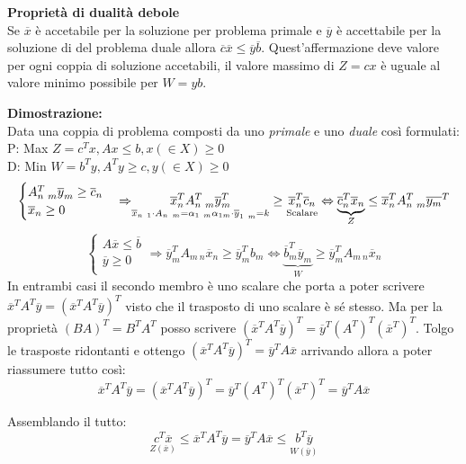 \documentclass{article}
\begin{document}
\textbf{Proprietà di dualità debole}\\
Se $\overline{x}$ è accetabile per la soluzione per problema primale e $\overline{y}$ è accettabile per la soluzione di del problema duale allora $\overline{c}\overline{x}\le \overline{y}\overline{b}$. Quest'affermazione deve valore per ogni coppia di soluzione accetabili, il valore massimo di $Z=cx$ è uguale al valore minimo possibile per $W=yb$.\\
\begin{tcolorbox}[
    colback=lightgray,
    colframe=black,
    coltext=black,
    title=Dimostrazione,
    colbacktitle=black,
    coltitle=lightgray,
    breakable
  ]
  \textbf{Dimostrazione:}\\
  Data una coppia  di problema composti da uno \textit{primale} e uno \textit{duale} così formulati:\\
  \hspace{3cm}P: Max $Z=c^Tx, Ax \le b, x (\in X) \ge 0$\\
  \hspace{3cm}D: Min $W=b^Ty, A^Ty\ge c, y(\in X) \ge 0$\\
  $$
    \begin{cases}
      A^T_{n \ m}\overline{y}_m \ge \overline{c}_n \\
      \overline{x}_n \ge 0                         \\
    \end{cases}
    {\Rightarrow} \underset{\overline{x}_{n\ 1}\cdot A_{n\ m} = \alpha_{1\ m} \\ \alpha_{1 m}\cdot \overline{y}_{1\ m} = k}{\overline{x}_n^TA^T_{n\ m}\overline{y}^T_m} \ge \underset{\text{Scalare}}{\overline{x}_n^T\overline{c}_n} \Leftrightarrow \underbrace{\overline{c}_n^T\overline{x}_n}_{Z} \le \overline{x}_n^TA_{n\ m}^T\overline{y_m}^T
  $$
  $$
    \begin{cases}
      A\overline{x} \le \overline{b} \\
      \overline{y}\ge 0              \\
    \end{cases}
    {\Rightarrow} \overline{y}_m^TA_{m\ n}\overline{x}_n \ge \overline{y}_m^Tb_m \Leftrightarrow \underbrace{\overline{b}_m^T\overline{y}_m}_{W} \ge \overline{y}_m^TA_{m\ n}\overline{x}_n
  $$
  In entrambi casi il secondo membro è uno scalare che porta a poter scrivere $\overline{x}^TA^T\overline{y}=(\overline{x}^TA^T\overline{y})^T$ visto che il trasposto di uno scalare è sé stesso. Ma per la proprietà $(BA)^T=B^TA^T$ posso scrivere $(\overline{x}^TA^T\overline{y})^T=\overline{y}^T (A^T)^T (\overline{x}^T)^T$. Tolgo le trasposte ridontanti e ottengo $(\overline{x}^TA^T\overline{y})^T=\overline{y}^TA\overline{x}$ arrivando allora a poter riassumere tutto così:
  $$\overline{x}^T A^T \overline{y} = (\overline{x}^T A^T \overline{y})^T = \overline{y}^T (A^T)^T (\overline{x}^T)^T = \overline{y}^T A \overline{x}$$

  Assemblando il tutto:
  $$\underset{Z(\overline{x})}{c^T \overline{x}} \leq \overline{x}^T A^T \overline{y} = \overline{y}^T A \overline{x} \leq \underset{W(\overline{y})}{b^T \overline{y}}$$
\end{tcolorbox}
\end{document}
